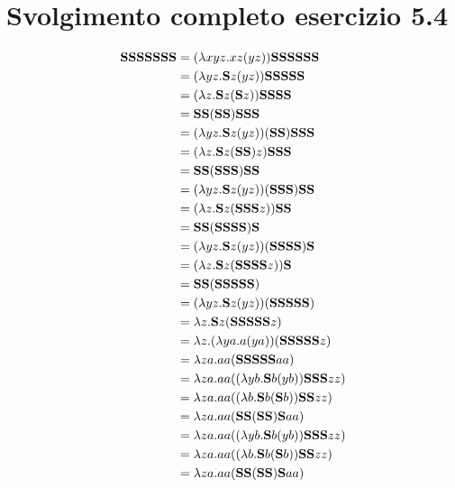 \chapter{Svolgimento completo esercizio 5.4}

	\begin{align*}
		\sssssssvar & = (\lambda xyz.xz(yz))\ssssssvar\\
		& = (\lambda yz.\svar z(yz))\sssssvar\\
		& = (\lambda z.\svar z(\svar z))\ssssvar\\
		& = \ssvar(\ssvar)\sssvar\\
		& = (\lambda yz.\svar z(yz))(\ssvar)\sssvar\\
		& = (\lambda z.\svar z(\ssvar)z)\sssvar\\
		& = \ssvar(\sssvar)\ssvar\\
		& = (\lambda yz.\svar z(yz))(\sssvar)\ssvar\\
		& = (\lambda z.\svar z(\sssvar z))\ssvar\\
		& = \ssvar(\ssssvar)\svar\\
		& = (\lambda yz.\svar z(yz))(\ssssvar)\svar\\
		& = (\lambda z.\svar z(\ssssvar z))\svar\\
		& = \ssvar(\sssssvar)\\
		& = (\lambda yz.\svar z(yz))(\sssssvar)\\
		& = \lambda z.\svar z(\sssssvar z)\\
		& = \lambda z.(\lambda ya.a (y a))(\sssssvar z)\\
		& = \lambda za.a a(\sssssvar a a)\\
		& = \lambda za.a a((\lambda yb.\svar b (y b)) \sssvar z z)\\
		& = \lambda za.a a((\lambda b.\svar b(\svar b))\svar \svar z z)\\
		& = \lambda za.a a(\svar \svar(\svar \svar)\svar a a)\\
		& = \lambda za.a a((\lambda yb.\svar b(y b))\sssvar z z)\\
		& = \lambda za.a a((\lambda b.\svar b(\svar b))\ssvar z z)\\
		& = \lambda za.a a(\svar \svar(\ssvar )\svar a a)\\
	\end{align*}
